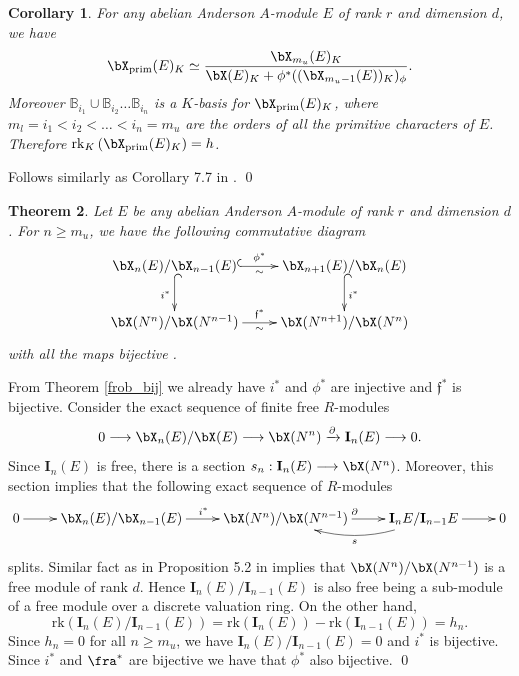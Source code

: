 \documentclass{amsart}
\newtheorem {theorem} {\bf{Theorem}}[section]
\newtheorem {corollary}[theorem] {\bf Corollary}
\numberwithin {equation}{section}
\begin{document}
\begin{corollary}\label{rk_X_prim} For any abelian Anderson $A$-module $E$ of rank $r$ and dimension $d$, we have $${\bX}_{\mathrm{prim}}(E)_{K}\simeq \dfrac{{\bX}_{m_{u}}(E)_{K}}{\bX(E)_{K}+\phi^{*}(({\bX}_{m_{u}-1}(E))_{K})_{\phi}}.$$ Moreover $\mathbb{B}_{i_{1}}\cup \mathbb{B}_{i_{2}}\ldots \mathbb{B}_{i_{n}} $ is a $K$-basis for ${\bX}_{\mathrm{prim}}(E)_{K}$, where $m_{l}= i_{1}< i_{2}< \ldots < i_{n}= m_{u}$  are the orders of all the primitive characters of $E$. Therefore $\mathrm{rk}_{K}\left({\bX}_{\mathrm{prim}}(E)_{K}\right)=h$.
\end{corollary}
\proof Follows similarly as Corollary 7.7 in \cite{BS a}. \qed
\begin{theorem}\label{phi*_bij}
Let $E$ be any abelian Anderson $A$-module of rank $r$ and dimension $d$. For $n\geq m_{u}$, we have the following commutative diagram
 $${
\xymatrix{
{\bX}_{n}(E)/{\bX}_{n-1}(E)\ar@{^{(}->}[d]_{i^{*}} \ar@{^{(}->}[r]^{\phi^{*}}_{\sim} &{\bX}_{n+1}(E)/{\bX}_{n}(E)\ar@{^{(}->}[d]^{i^{*}}  \\
{\bX}(N^{n})/{\bX}(N^{n-1}) \ar[r]^{\mathfrak{f}^{*}}_{\sim} &{\bX}(N^{n+1})/{\bX}(N^{n}) }}
$$
with all the maps bijective . 
\end{theorem}
\proof From Theorem \ref{frob_bij} we already have $i^{*}$ and $\phi^{*}$ are injective and $\mathfrak{f}^{*}$ is bijective. Consider the exact sequence of finite free $R$-modules
$$0 \longrightarrow {\bX}_{n}(E)/\bX(E)\longrightarrow {\bX}(N^{n})\xrightarrow{\partial} \mathbf{I}_{n}(E) \longrightarrow 0.$$
Since $\mathbf{I}_{n}(E)$ is free, there is a section $s_{n}:\mathbf{I}_{n}(E)\longrightarrow {\bX}(N^{n})$. Moreover, this section implies that the following exact sequence of $R$-modules
$${
\xymatrix{
0\ar[r]&{\bX}_{n}(E)/{\bX}_{n-1}(E) \ar[r]^{i^{*}} &{\bX}(N^{n})/{\bX}(N^{n-1})\ar[r]^{\partial} &\mathbf{I}_{n}E/\mathbf{I}_{n-1}E\ar@/^1pc/[l]^{s}\ar[r]& 0 \\
}}
$$
splits. Similar fact as in Proposition 5.2 in \cite{BS a} implies that ${\bX}(N^{n})/{\bX}(N^{n-1})$ is a free module of rank $d$. Hence $\mathbf{I}_{n}(E)/
\mathbf{I}_{n-1}(E)$ is also free being a sub-module of a free module over a discrete valuation ring. On the other hand,  $$\mathrm{rk}\left(\mathbf{I}_{n}(E)
/\mathbf{I}_{n-1}(E)\right)=\mathrm{rk}(\mathbf{I}_{n}(E))-\mathrm{rk} (\mathbf{I}_{n-1}(E))=h_{n}.$$
Since $h_{n}=0$ for all $n\geq m_{u}$, we have $\mathbf{I}_{n}(E)/\mathbf{I}_{n-1}(E)=0$ and $i^{*}$ is bijective. Since $i^*$ and $\fra^*$ are bijective we 
have that $\phi^{*}$ also bijective. 
\qed
\end{document}
